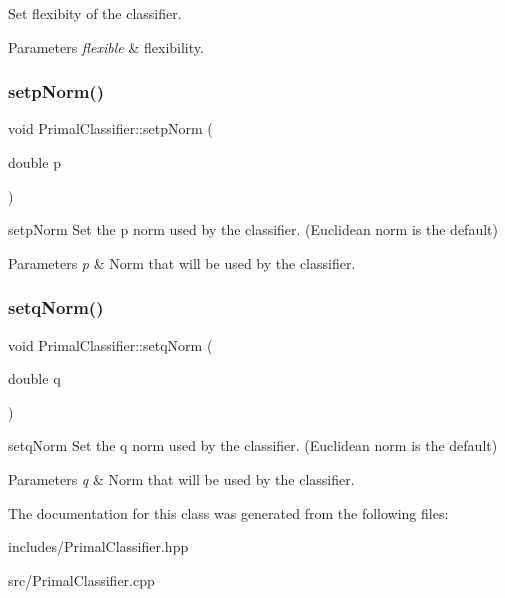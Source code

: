 Set flexibity of the classifier. 


\begin{DoxyParams}{Parameters}
{\em flexible} & flexibility. \\
\hline
\end{DoxyParams}
\mbox{\label{class_primal_classifier_a30cd3926ea5e7341920dcb5480567af1}} 
\subsubsection{\texorpdfstring{setp\+Norm()}{setpNorm()}}
{\footnotesize\ttfamily void Primal\+Classifier\+::setp\+Norm (\begin{DoxyParamCaption}\item[{double}]{p }\end{DoxyParamCaption})}



setp\+Norm Set the p norm used by the classifier. (Euclidean norm is the default) 


\begin{DoxyParams}{Parameters}
{\em p} & Norm that will be used by the classifier. \\
\hline
\end{DoxyParams}
\mbox{\label{class_primal_classifier_a22ca554e2a8d33d43c813b6b9b3e4a6a}} 
\subsubsection{\texorpdfstring{setq\+Norm()}{setqNorm()}}
{\footnotesize\ttfamily void Primal\+Classifier\+::setq\+Norm (\begin{DoxyParamCaption}\item[{double}]{q }\end{DoxyParamCaption})}



setq\+Norm Set the q norm used by the classifier. (Euclidean norm is the default) 


\begin{DoxyParams}{Parameters}
{\em q} & Norm that will be used by the classifier. \\
\hline
\end{DoxyParams}


The documentation for this class was generated from the following files\+:\begin{DoxyCompactItemize}
\item 
includes/Primal\+Classifier.\+hpp\item 
src/Primal\+Classifier.\+cpp\end{DoxyCompactItemize}
